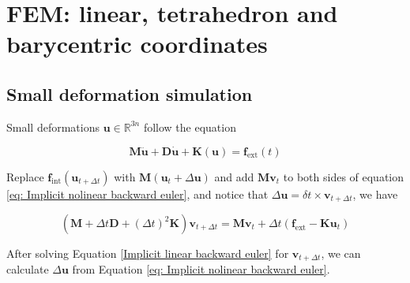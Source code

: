 
\chapter{FEM: linear, tetrahedron and barycentric coordinates}

\section{Small deformation simulation}
Small deformations $ \mathbf{u} \in \mathbb{R}^{3n} $ follow the equation

\begin{equation}
\mathbf{M}\ddot{\mathbf{u}}+\mathbf{D}\dot{\mathbf{u}}+\mathbf{K}(\mathbf{u})=\mathbf{f}_{\mathrm{ext}}(t)
\end{equation}

Replace $ \mathbf{f}_\mathrm{int}(\mathbf{u}_{t+\Delta t}) $ with $ \mathbf{M}(\mathbf{u}_t+\Delta \mathbf{u}) $ and add $ \mathbf{M}\mathbf{v}_t $ to both sides of equation \ref{eq: Implicit nolinear backward euler}, and notice that $ \Delta \mathbf{u} = \delta t \times \mathbf{v}_{t+\Delta t} $, we have

\begin{equation} \label{Implicit linear backward euler}
\left(\mathbf{M}+\Delta t\mathbf{D}+(\Delta t)^2\mathbf{K}\right)\mathbf{v}_{t+\Delta t} = \mathbf{M}\mathbf{v}_t + \Delta  t\left(\mathbf{f}_{\mathrm{ext}}-\mathbf{K}\mathbf{u}_t\right)
\end{equation}

After solving Equation \ref{Implicit linear backward euler} for $ \mathbf{v}_{t+\Delta t} $, we can calculate $ \Delta \mathbf{u} $ from Equation \ref{eq: Implicit nolinear backward euler}.